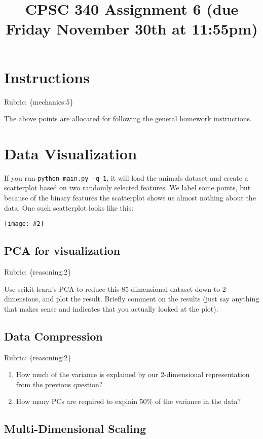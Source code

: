 \documentclass{article}
\def\rubric#1{\gre{Rubric: \{#1\}}}{}
\def\blu#1{{\color{blu}#1}}
\def\gre#1{{\color{gre}#1}}
\newcommand{\centerfig}[2]{\begin{center}\texttt{[image: \#2]}\end{center}}
\def\enum#1{\begin{enumerate}#1\end{enumerate}}
\begin{document}
\title{CPSC 340 Assignment 6 (due Friday November 30th at 11:55pm)}
\date{}
\maketitle

\vspace{-7em}


\section*{Instructions}
\rubric{mechanics:5}

The above points are allocated for following the general homework instructions. 

\section{Data Visualization}

If you run \verb|python main.py -q 1|, it will load the animals dataset and create a scatterplot based on two randomly selected features.
We label some points, but because of the binary features the scatterplot shows us almost nothing about the data. One such scatterplot looks like this:

\centerfig{.5}{../figs/two_random_features.png}

\subsection{PCA for visualization}
\rubric{reasoning:2}

Use scikit-learn's PCA to reduce this 85-dimensional dataset down to 2 dimensions, and plot the result. Briefly comment on the results (just say anything that makes sense and indicates that you actually looked at the plot).

\subsection{Data Compression}
\rubric{reasoning:2}

\blu{\enum{
\item How much of the variance is explained by our 2-dimensional representation from the previous question?
\item How many PCs are required to explain 50\% of the variance in the data?
}}


\subsection{Multi-Dimensional Scaling}
\end{document}

